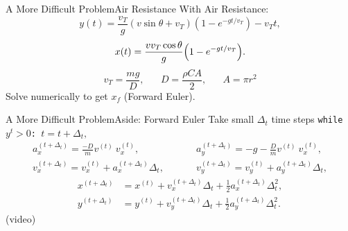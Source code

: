 \documentclass{beamer}
\begin{document}
\begin{frame}{A More Difficult Problem}{Air Resistance}
\vspace{-20pt}With Air Resistance:
\begin{equation*}
y(t)=\frac{v_T}{g}(v\sin\theta+v_T)\left(1-e^{-gt/v_T}\right)-v_Tt,
\end{equation*}
\begin{equation*}
x(t)=\frac{vv_T\cos\theta}{g}\qty(1-e^{-gt/v_T}).
\end{equation*}
\begin{equation*}
v_T=\frac{mg}{D},\hspace{20pt}D=\frac{\rho C A}{2},\hspace{20pt}A=\pi r^2
\end{equation*}
\hspace{30pt}Solve numerically to get $x_f$ (Forward Euler).
\end{frame}

\begin{frame}{A More Difficult Problem}{Aside: Forward Euler}
\vspace{-20pt}Take small $\Delta_t$ time steps
\texttt{while $y^t>0$: $t=t+\Delta_t,$}
\begin{align*}
a_{x}^{(t+\Delta_t)} = \frac{-D}{m}v^{(t)}\ v^{(t)}_{x},
        &\hspace{30pt}a_{y}^{(t+\Delta_t)} = -g-\frac{D}{m}v^{(t)}\ v^{(t)}_{x},\\[15pt]
v_{x}^{(t+\Delta_t)} =v_{x}^{(t)}+ a_{x}^{(t+\Delta_t)}\Delta_t,
        &\hspace{30pt}v_{y}^{(t+\Delta_t)} =v_{y}^{(t)}+ a_{y}^{(t+\Delta_t)}\Delta_t,
        \end{align*}
        \begin{align*}
x^{(t+\Delta_t)} &=x^{(t)}+ v^{(t+\Delta_t)}_{x}\Delta_t + \frac{1}{2}a^{(t+\Delta_t)}_{x} \Delta_t^2,\\
y^{(t+\Delta_t)} &=y^{(t)}+ v^{(t+\Delta_t)}_{y}\Delta_t + \frac{1}{2}a^{(t+\Delta_t)}_{y} \Delta_t^2.
\end{align*}
\hspace{50pt}(video)
\end{frame}
\end{document}

